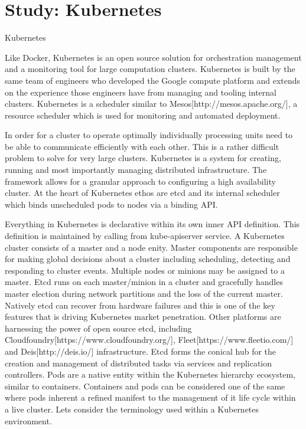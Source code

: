 \documentclass{article}
\begin{document}
\section{Study: Kubernetes}


Kubernetes
\par
Like Docker, Kubernetes is an open source solution for orchestration management and a monitoring tool for large computation clusters. Kubernetes is built by the same team of engineers who developed the Google compute platform and extends on the experience those engineers have from managing and tooling internal clusters. Kubernetes is a scheduler similar to Mesos[http://mesos.apache.org/], a resource scheduler which is used for monitoring and automated deployment.
\par
In order for a cluster to operate optimally individually processing units need to be able to communicate efficiently with each other. This is a rather difficult problem to solve for very large clusters. Kubernetes is a system for creating, running and most importantly managing distributed infrastructure. The framework allows for a granular approach to configuring a high availability cluster. At the heart of Kubernetes ethos are etcd and its internal scheduler which binds unscheduled pods to nodes via a binding API.
\par
Everything in Kubernetes is declarative within its own inner API definition. This definition is maintained by calling from kube-apiserver service. A Kubernetes cluster consists of a master and a node enity. Master components are responsible for making global decisions about a cluster including scheduling, detecting and responding to cluster events. Multiple nodes or minions may be assigned to a master. Etcd runs on each master/minion in a cluster and gracefully handles master election during network partitions and the loss of the current master. Natively etcd can recover from hardware failures and this is one of the key features that is driving Kubernetes market penetration. Other platforms are harnessing the power of open source etcd, including Cloudfoundry[https://www.cloudfoundry.org/], Fleet[https://www.fleetio.com/] and Deis[http://deis.io/] infrastructure. Etcd forms the conical hub for the creation and management of distributed tasks via services and replication controllers. Pods are a native entity within the Kubernetes hierarchy ecosystem, similar to containers. Containers and pods can be considered one of the same where pods inherent a refined manifest to the management of it life cycle within a live cluster.  Lets consider the terminology used within a Kubernetes environment.
\end{document}
